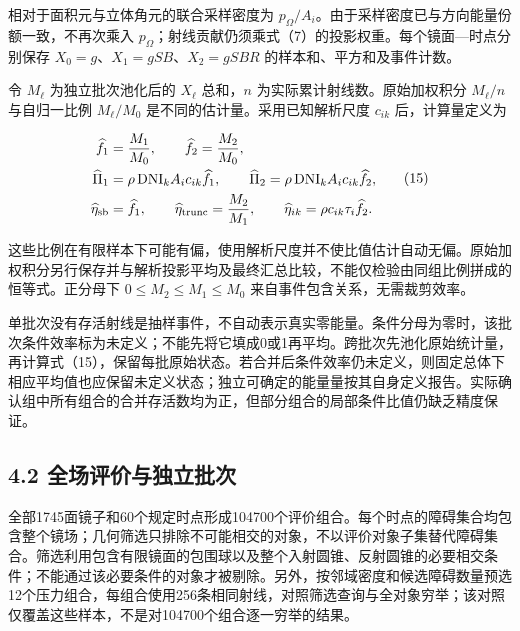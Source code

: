 \documentclass[UTF8,fontset=windows,zihao=-4]{ctexart}
\begin{document}
相对于面积元与立体角元的联合采样密度为 \(p_\Omega/A_i\)。由于采样密度已与方向能量份额一致，不再次乘入 \(p_\Omega\)；射线贡献仍须乘式（7）的投影权重。每个镜面—时点分别保存 \(X_0=g\)、\(X_1=gSB\)、\(X_2=gSBR\) 的样本和、平方和及事件计数。

\par\noindent\begin{minipage}{\linewidth}
令 \(M_\ell\) 为独立批次池化后的 \(X_\ell\) 总和，\(n\) 为实际累计射线数。原始加权积分 \(M_\ell/n\) 与自归一比例 \(M_\ell/M_0\) 是不同的估计量。采用已知解析尺度 \(c_{ik}\) 后，计算量定义为

\[
\begin{aligned}
\widehat f_1&=\frac{M_1}{M_0},\qquad
\widehat f_2=\frac{M_2}{M_0},\\
\widehat\Pi_1&=\rho\,\mathrm{DNI}_kA_i c_{ik}\widehat f_1,\qquad
\widehat\Pi_2=\rho\,\mathrm{DNI}_kA_i c_{ik}\widehat f_2,\\
\widehat\eta_{\rm sb}&=\widehat f_1,\qquad
\widehat\eta_{\rm trunc}=\frac{M_2}{M_1},\qquad
\widehat\eta_{ik}=\rho c_{ik}\tau_i\widehat f_2.
\end{aligned}\tag{15}
\]
\end{minipage}\par

这些比例在有限样本下可能有偏，使用解析尺度并不使比值估计自动无偏。原始加权积分另行保存并与解析投影平均及最终汇总比较，不能仅检验由同组比例拼成的恒等式。正分母下 \(0\le M_2\le M_1\le M_0\) 来自事件包含关系，无需裁剪效率。

单批次没有存活射线是抽样事件，不自动表示真实零能量。条件分母为零时，该批次条件效率标为未定义；不能先将它填成0或1再平均。跨批次先池化原始统计量，再计算式（15），保留每批原始状态。若合并后条件效率仍未定义，则固定总体下相应平均值也应保留未定义状态；独立可确定的能量量按其自身定义报告。实际确认组中所有组合的合并存活数均为正，但部分组合的局部条件比值仍缺乏精度保证。

\subsection*{4.2 全场评价与独立批次}

全部1745面镜子和60个规定时点形成104700个评价组合。每个时点的障碍集合均包含整个镜场；几何筛选只排除不可能相交的对象，不以评价对象子集替代障碍集合。筛选利用包含有限镜面的包围球以及整个入射圆锥、反射圆锥的必要相交条件；不能通过该必要条件的对象才被剔除。另外，按邻域密度和候选障碍数量预选12个压力组合，每组合使用256条相同射线，对照筛选查询与全对象穷举；该对照仅覆盖这些样本，不是对104700个组合逐一穷举的结果。
\end{document}
